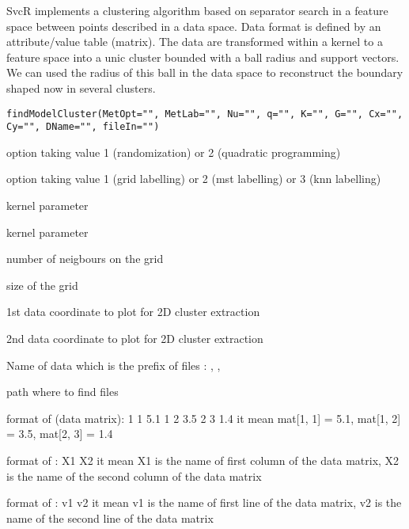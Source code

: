 \begin{Description}\relax
SvcR implements a clustering algorithm based on separator search in a feature 
space between points described in a data space. Data format is defined by 
an attribute/value table (matrix). The data are transformed within a kernel 
to a feature space into a unic cluster bounded with a ball radius and support vectors. 
We can used the radius of this ball in the data space 
to reconstruct the boundary shaped now in several clusters.
\end{Description}
\begin{Usage}
\begin{verbatim}
findModelCluster(MetOpt="", MetLab="", Nu="", q="", K="", G="", Cx="", Cy="", DName="", fileIn="")
\end{verbatim}
\end{Usage}
\begin{Arguments}
\begin{ldescription}
\item[\code{MetOpt}] option taking value 1 (randomization) or 2 (quadratic programming) 
\item[\code{MetLab}] option taking value 1 (grid labelling) or 2 (mst labelling) or 3 (knn labelling) 
\item[\code{Nu}] kernel parameter  
\item[\code{q}] kernel parameter 
\item[\code{K}] number of neigbours on the grid 
\item[\code{G}] size of the grid 
\item[\code{Cx}] 1st data coordinate to plot for 2D cluster extraction 
\item[\code{Cy}] 2nd data coordinate to plot for 2D cluster extraction 
\item[\code{DName}] Name of data which is the prefix of files :
, 
, 
\item[\code{fileIn}] path where to find files 
\end{ldescription}
\end{Arguments}
\begin{Details}\relax
format of  (data matrix): 
1 1 5.1       
1 2 3.5
2 3 1.4
it mean mat[1, 1] = 5.1, mat[1, 2] = 3.5, mat[2, 3] = 1.4

format of  : 
X1
X2
it mean X1 is the name of first column of the data matrix, X2 is the name of the second column of the data matrix

format of  : 
v1
v2
it mean v1 is the name of first line of the data matrix, v2 is the name of the second line of the data matrix
\end{Details}
